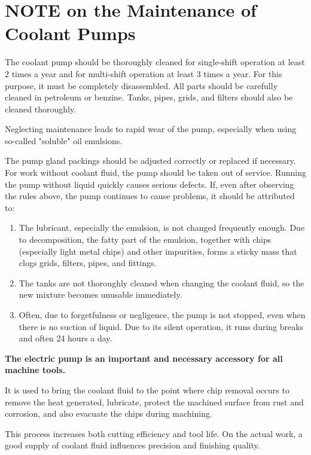 \chapter*{NOTE on the Maintenance of Coolant Pumps}

The coolant pump should be thoroughly cleaned for single-shift operation at least 2 times a year and for multi-shift operation at least 3 times a year.
For this purpose, it must be completely disassembled. All parts should be carefully cleaned in petroleum or benzine.
Tanks, pipes, grids, and filters should also be cleaned thoroughly.

Neglecting maintenance leads to rapid wear of the pump, especially when using so-called "soluble" oil emulsions.

The pump gland packings should be adjusted correctly or replaced if necessary.
For work without coolant fluid, the pump should be taken out of service.
Running the pump without liquid quickly causes serious defects.
If, even after observing the rules above, the pump continues to cause problems, it should be attributed to:

\begin{enumerate}
    \item The lubricant, especially the emulsion, is not changed frequently enough.
    Due to decomposition, the fatty part of the emulsion, together with chips (especially light metal chips) and other impurities,
    forms a sticky mass that clogs grids, filters, pipes, and fittings.
    \item The tanks are not thoroughly cleaned when changing the coolant fluid, so the new mixture becomes unusable immediately.
    \item Often, due to forgetfulness or negligence, the pump is not stopped, even when there is no suction of liquid.
    Due to its silent operation, it runs during breaks and often 24 hours a day.
\end{enumerate}

\textbf{The electric pump is an important and necessary accessory for all machine tools.}

It is used to bring the coolant fluid to the point where chip removal occurs to remove the heat generated,
lubricate, protect the machined surface from rust and corrosion, and also evacuate the chips during machining.

This process increases both cutting efficiency and tool life.
On the actual work, a good supply of coolant fluid influences precision and finishing quality.
